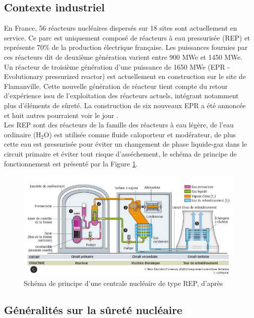 \subsection{Contexte industriel}
En France, 56 réacteurs nucléaires dispersés sur 18 sites sont actuellement en service. Ce parc est uniquement composé de réacteurs à eau pressurisée (REP) et représente 70\% de la production électrique française. Les puissances fournies par ces réacteurs dit de deuxième génération varient entre 900 MWe et 1450 MWe. Un réacteur de troisième génération d'une puissance de 1650 MWe (EPR - Evolutionary pressurized reactor) est actuellement en construction sur le site de Flamanville. Cette nouvelle génération de réacteur tient compte du retour d'expérience issu de l'exploitation des réacteurs actuels, intégrant notamment plus d'éléments de sûreté. La construction de six nouveaux EPR a été annoncée et huit autres pourraient voir le jour \cite{noauthor_emmanuel_2021}. \\
Les REP sont des réacteurs de la famille des réacteurs à eau légère, de l'eau ordinaire (H$_2$O) est utilisée comme fluide caloporteur et modérateur, de plus cette eau est pressurisée pour éviter un changement de phase liquide-gaz dans le circuit primaire et éviter tout risque d'asséchement, le schéma de principe de fonctionnement est présenté par la Figure \ref{fig:schcentrale1}. %
\begin{figure}[H]
	\centering
	\includegraphics[width=0.9\linewidth]{figure/sch_centrale1}
	\caption[Schéma de principe d'une centrale nucléaire de type REP]{Schéma de principe d'une centrale nucléaire de type REP, d'après \cite{noauthor_manuel_nodate}}
	\label{fig:schcentrale1}
\end{figure} 
\subsection{Généralités sur la sûreté nucléaire}

